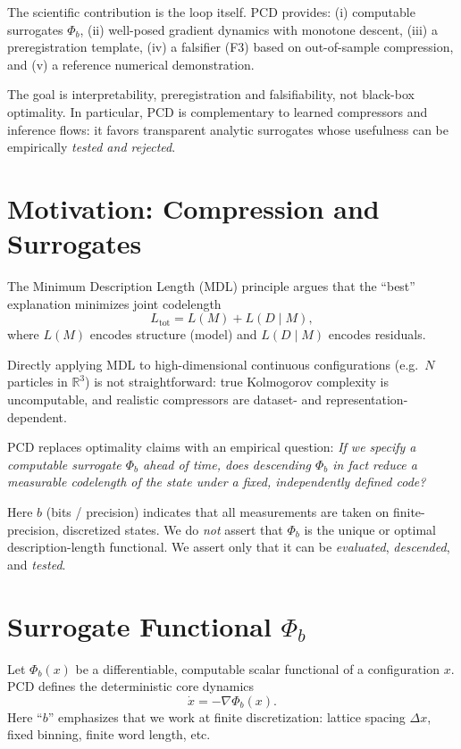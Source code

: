 \documentclass[11pt]{article}
\begin{document}
The scientific contribution is the loop itself.
PCD provides:
(i) computable surrogates $\Phi_b$,
(ii) well-posed gradient dynamics with monotone descent,
(iii) a preregistration template,
(iv) a falsifier (F3) based on out-of-sample compression, and
(v) a reference numerical demonstration.

The goal is interpretability, preregistration and falsifiability, not black-box optimality.
In particular, PCD is complementary to learned compressors and inference flows: it favors transparent analytic surrogates whose usefulness can be empirically \emph{tested and rejected}.

\section{Motivation: Compression and Surrogates}
The Minimum Description Length (MDL) principle argues that the ``best'' explanation minimizes joint codelength
\begin{equation}
    L_{\mathrm{tot}} = L(M) + L(D \mid M),
\end{equation}
where $L(M)$ encodes structure (model) and $L(D\mid M)$ encodes residuals.

Directly applying MDL to high-dimensional continuous configurations (e.g.\ $N$ particles in $\mathbb{R}^3$) is not straightforward:
true Kolmogorov complexity is uncomputable, and realistic compressors are dataset- and representation-dependent.

PCD replaces optimality claims with an empirical question:
\emph{If we specify a computable surrogate $\Phi_b$ ahead of time, does descending $\Phi_b$ in fact reduce a measurable codelength of the state under a fixed, independently defined code?}

Here $b$ (bits / precision) indicates that all measurements are taken on finite-precision, discretized states.
We do \emph{not} assert that $\Phi_b$ is the unique or optimal description-length functional.
We assert only that it can be \emph{evaluated}, \emph{descended}, and \emph{tested}.

\section{Surrogate Functional $\Phi_b$}
Let $\Phi_b(x)$ be a differentiable, computable scalar functional of a configuration $x$.
PCD defines the deterministic core dynamics
\begin{equation}
    \dot{x} = -\nabla \Phi_b(x).
    \label{eq:gradientflow}
\end{equation}
Here ``$b$'' emphasizes that we work at finite discretization: lattice spacing $\Delta x$, fixed binning, finite word length, etc.
\end{document}
